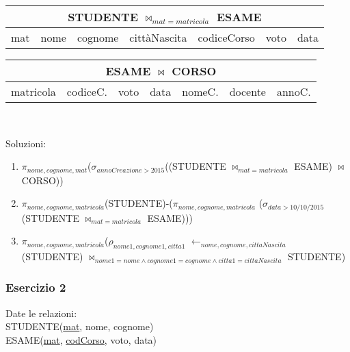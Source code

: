 \documentclass[a4paper]{article}
\begin{document}
\begin{mybox}{}
\begin{tabular}{|c|c|c|c|c|c|c|}
  \hline
  \multicolumn{7}{|c|}{STUDENTE $\Join_{mat=matricola}$ ESAME}\\
  \hline
  mat & nome & cognome & cittàNascita & codiceCorso & voto & data\\
  \hline
\end{tabular}
\medskip\par \begin{tabular}{|c|c|c|c|c|c|c|}
  \hline
  \multicolumn{7}{|c|}{ESAME $\Join$ CORSO}\\
  \hline
  matricola & codiceC. & voto & data & nomeC. & docente & annoC.\\
  \hline
\end{tabular}
\medskip\\\par Soluzioni:
\begin{enumerate}
  \item $\pi_{nome, cognome, mat}$($\sigma_{annoCreazione>2015}$((STUDENTE $\Join_{mat=matricola}$ ESAME) $\Join$ CORSO))
  \item $\pi_{nome, cognome, matricola}$(STUDENTE)-($\pi_{nome, cognome, matricola}$ ($\sigma_{data>10/10/2015}$(STUDENTE $\Join_{mat=matricola}$ ESAME)))
  \item $\pi_{nome, cognome, matricola}$($\rho_{nome1, cognome1, citta1}$ $\leftarrow _{nome, cognome, cittaNascita}$(STUDENTE) $\Join_{nome1=nome \land cognome1=cognome \land citta1=cittaNascita}$ STUDENTE)
\end{enumerate}
\end{mybox}\par \subsubsection{Esercizio 2}
Date le relazioni:\medskip\\
STUDENTE(\underline{mat}, nome, cognome)\\
ESAME(\underline{mat}, \underline{codCorso}, voto, data)\\
\end{document}
